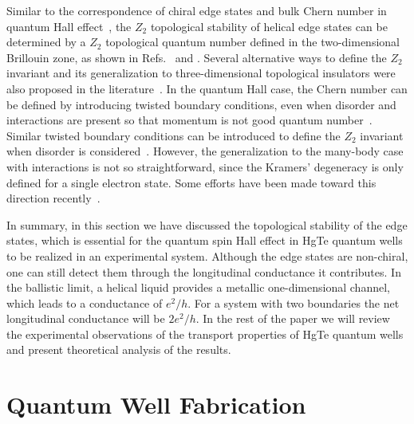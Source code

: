\documentclass{article}
\begin{document}
Similar to the correspondence of chiral edge states and bulk Chern
number in quantum Hall effect~\cite{thouless1982}, the $Z_2$
topological stability of helical edge states can be determined by a
$Z_2$ topological quantum number defined in the two-dimensional
Brillouin zone, as shown in Refs.~ and
. Several alternative ways to define the $Z_2$
invariant and its generalization to three-dimensional topological
insulators were also proposed in the
literature~\cite{fu2007a,fu2007b,moore2007,roy2006a,roy2006b,roy2006c}.
In the quantum Hall case, the Chern number can be defined by
introducing twisted boundary conditions, even when disorder and
interactions are present so that momentum is not good quantum
number~\cite{niu1985}. Similar twisted boundary conditions can be
introduced to define the $Z_2$ invariant when disorder is
considered~\cite{essin2007}. However, the generalization to the
many-body case with interactions is not so straightforward, since
the Kramers' degeneracy is only defined for a single electron state.
Some efforts have been made toward this direction
recently~\cite{lee2007}.

In summary, in this section we have discussed  the topological
stability of the edge states, which is essential for the quantum
spin Hall effect in HgTe quantum wells to be realized in an
experimental system. Although the edge states are non-chiral, one
can still detect them through the longitudinal conductance it
contributes. In the ballistic limit, a  helical liquid provides a
metallic one-dimensional channel, which leads to a conductance of
$e^2/h$. For a system with two boundaries the net longitudinal
conductance will be $2e^2/h$. In the rest of the paper we will
review the experimental observations of the transport properties
of HgTe quantum wells and present  theoretical analysis of the
results.

\section{ Quantum Well Fabrication}
\end{document}

